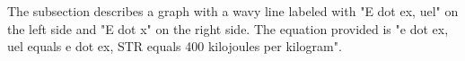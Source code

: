 The subsection describes a graph with a wavy line labeled with "E dot ex, uel" on the left side and "E dot x" on the right side. The equation provided is "e dot ex, uel equals e dot ex, STR equals 400 kilojoules per kilogram".